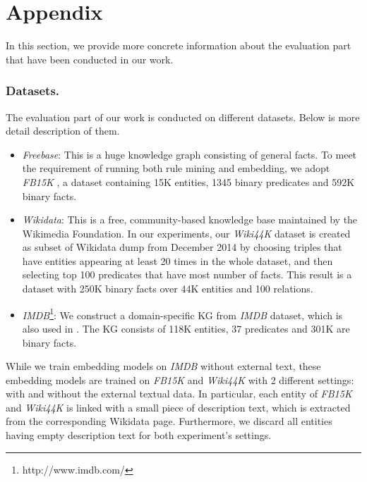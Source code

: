 
\section{Appendix}
\label{sec:appendix}

In this section, we provide more concrete information about the evaluation part that have been conducted in our  work.
\subsubsection{Datasets.} The evaluation part of our work is conducted on different datasets. Below is more detail description of them.
\begin{itemize}
\item \textit{Freebase}: This is a huge knowledge graph consisting of general facts. To meet the requirement of running both rule mining and embedding, we adopt \textit{FB15K} \cite{Bordes:NIPS2013}, a dataset containing 15K entities, 1345 binary predicates and 592K binary facts.
\item \textit{Wikidata}: This is a free, community-based knowledge base maintained by the Wikimedia Foundation. In our experiments, our \textit{Wiki44K} dataset is created as subset of Wikidata dump from December 2014 by choosing triples that have entities appearing at least 20 times in the whole dataset, and then selecting top 100 predicates that have most number of facts. This result is a dataset with 250K binary facts over 44K entities and 100 relations.
\item \textit{IMDB}\footnote{http://www.imdb.com/}: We construct a domain-specific KG from \textit{IMDB} dataset, which is also used in \cite{trantowards}. The KG consists of 118K entities, 37 predicates and 301K are binary facts.
\end{itemize}
While we train embedding models on \textit{IMDB} without external text, these embedding models are trained on \textit{FB15K} and \textit{Wiki44K} with 2 different settings: with and without the external textual data. In particular, each entity of \textit{FB15K} and \textit{Wiki44K} is linked with a small piece of description text, which is extracted from the corresponding Wikidata page. Furthermore, we discard all entities having empty description text for both experiment's settings.


